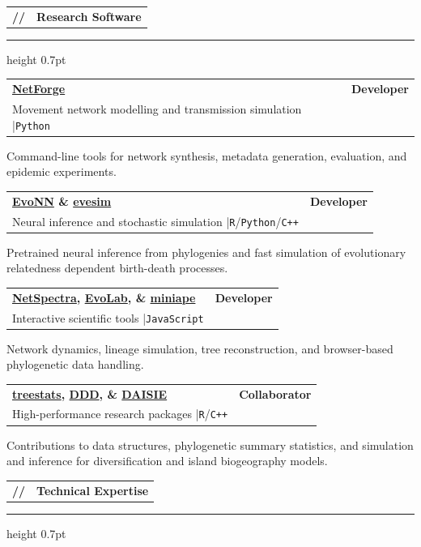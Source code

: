 \documentclass[10pt,a4paper]{article}
\makeatletter
\newcommand{\cvsection}[1]{%
  \Needspace{4\baselineskip}%
  \vspace{0.72em}%
  \noindent
  \begin{tabularx}{\textwidth}{@{}l@{\hspace{0.58em}}X@{}}
    {\color{Teal}\ttfamily\bfseries //} &
    {\large\bfseries\color{Teal} #1}
  \end{tabularx}
  \vspace{0.16em}\par
  {\color{Line}\hrule height 0.7pt}
  \vspace{0.42em}
}
\newcommand{\projectentry}[4]{%
  \Needspace{5\baselineskip}%
  \begin{tabularx}{\textwidth}{@{}X@{\hspace{0.3cm}}>{\raggedleft\arraybackslash}p{3.05cm}@{}}
    {\bfseries\color{Ink} #1} & {\small\bfseries\color{Teal} #2} \\
    {\small\color{Muted} #3} & {}
  \end{tabularx}
  \vspace{0.12em}
  #4
  \vspace{0.48em}
}
\newcommand{\tool}[1]{\texttt{\color{Navy}#1}}
\newcommand{\sep}{\enspace\textcolor{Line}{|}\enspace}
\makeatother
\begin{document}
\cvsection{Research Software}

\projectentry
  {\href{https://qtj.me/NetForge}{NetForge}}
  {Developer}
  {Movement network modelling and transmission simulation \sep \tool{Python}}
  {\begin{cvlist}
      \item Command-line tools for network synthesis, metadata generation, evaluation, and epidemic
      experiments.
  \end{cvlist}}

\projectentry
  {\href{https://github.com/EvoLandEco/EvoNN}{EvoNN} \&
  \href{https://github.com/EvoLandEco/evesim}{evesim}}
  {Developer}
  {Neural inference and stochastic simulation \sep \tool{R}/\tool{Python}/\tool{C++}}
  {\begin{cvlist}
      \item Pretrained neural inference from phylogenies and fast simulation of evolutionary relatedness
      dependent birth-death processes.
  \end{cvlist}}

\projectentry
  {\href{https://github.com/EvoLandEco/NetSpectra}{NetSpectra},
  \href{https://github.com/EvoLandEco/EvoLab}{EvoLab}, \&
  \href{https://github.com/EvoLandEco/miniape}{miniape}}
  {Developer}
  {Interactive scientific tools \sep \tool{JavaScript}}
  {\begin{cvlist}
      \item Network dynamics, lineage simulation, tree reconstruction, and browser-based phylogenetic data
      handling.
  \end{cvlist}}

\projectentry
  {\href{https://github.com/thijsjanzen/treestats}{treestats},
  \href{https://github.com/rsetienne/DDD}{DDD}, \&
  \href{https://github.com/rsetienne/DAISIE}{DAISIE}}
  {Collaborator}
  {High-performance research packages \sep \tool{R}/\tool{C++}}
  {\begin{cvlist}
      \item Contributions to data structures, phylogenetic summary statistics, and simulation and
      inference for diversification and island biogeography models.
  \end{cvlist}}

\cvsection{Technical Expertise}
\end{document}
